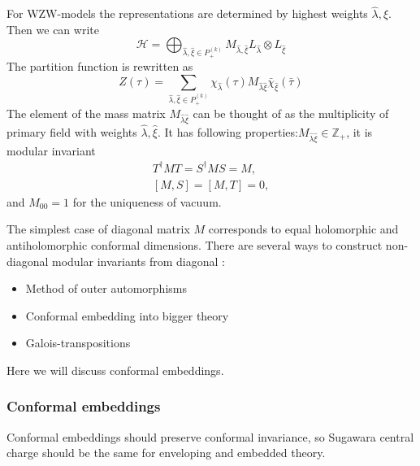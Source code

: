 \documentclass[a4paper,12pt]{article}
\theoremstyle{definition} \newtheorem{Def}{Definition}
\begin{document}
For WZW-models the representations are determined by highest weights $\hat \lambda, \hat \xi$. Then we can write
\begin{equation}
  \label{eq:105}
  \mathcal{H}=\bigoplus_{\hat \lambda,\hat \xi\in P^{(k)}_{+}}M_{\hat \lambda,\hat \xi} L_{\hat \lambda}\otimes L_{\hat \xi}
\end{equation}
The partition function is rewritten as
\begin{equation}
  \label{eq:106}
  Z(\tau)=\sum_{\hat \lambda,\hat \xi\in P^{(k)}_{+}} \chi_{\hat \lambda}(\tau)M_{\hat \lambda\hat\xi}\bar \chi_{\hat \xi}(\bar \tau)
\end{equation}
The element of the mass matrix $M_{\hat \lambda\hat\xi}$ can be thought of as the multiplicity of primary field with weights $\hat\lambda,\hat \xi$. It has following properties:$M_{\hat \lambda\hat\xi}\in \mathbb{Z}_+$, it is modular invariant
\begin{equation}
  \label{eq:108}
  \begin{aligned}
    T^{\dagger}MT=S^{\dagger}MS=M,\\
    [M,S]=[M,T]=0,
  \end{aligned}
\end{equation}
and $M_{00}=1$ for the uniqueness of vacuum. 

The simplest case of diagonal matrix $M$ corresponds to equal holomorphic and antiholomorphic conformal dimensions. There are several ways to construct non-diagonal modular invariants from diagonal \cite{difrancesco1997cft}:
\begin{itemize}
\item Method of outer automorphisms
\item Conformal embedding into bigger theory
\item Galois-transpositions
\end{itemize}
Here we will discuss conformal embeddings.

\subsubsection{Conformal embeddings}
\label{sec:conformal-embeddings}
Conformal embeddings should preserve conformal invariance, so Sugawara central charge should be the same for enveloping and embedded theory. 
\end{document}
